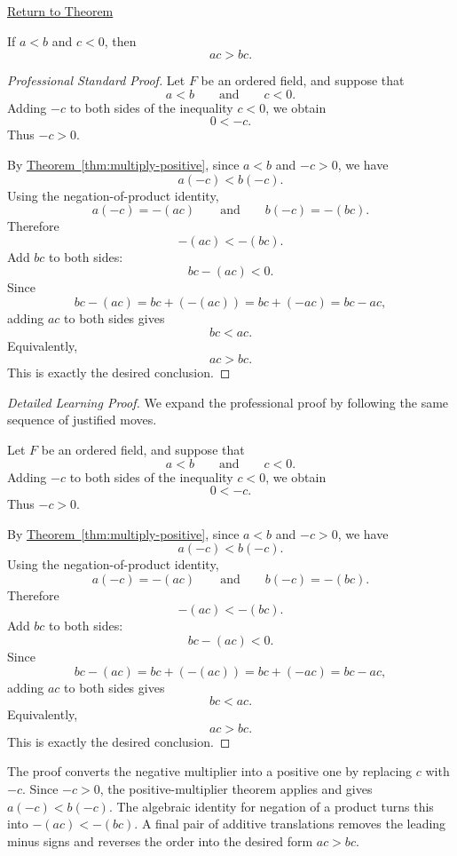 \newpage
{}
\label{prf:multiply-negative}

\begin{remark*}[Return]
\hyperref[thm:multiply-negative]{Return to Theorem}
\end{remark*}

\begin{theorem*}
If $a<b$ and $c<0$, then
\[
ac>bc.
\]
\end{theorem*}

\begin{proof}[Professional Standard Proof]
\LRAProofBodyStart
Let $F$ be an ordered field, and suppose that
\[
a<b
\qquad\text{and}\qquad
c<0.
\]
Adding $-c$ to both sides of the inequality $c<0$, we obtain
\[
0<-c.
\]
Thus $-c>0$.

By \hyperref[thm:multiply-positive]{Theorem~\ref*{thm:multiply-positive}},
since $a<b$ and $-c>0$, we have
\[
a(-c)<b(-c).
\]
Using the negation-of-product identity,
\[
a(-c)=-(ac)
\qquad\text{and}\qquad
b(-c)=-(bc).
\]
Therefore
\[
-(ac)<-(bc).
\]
Add $bc$ to both sides:
\[
bc-(ac)<0.
\]
Since
\[
bc-(ac)=bc+(-(ac))=bc+(-ac)=bc-ac,
\]
adding $ac$ to both sides gives
\[
bc<ac.
\]
Equivalently,
\[
ac>bc.
\]
This is exactly the desired conclusion.
\end{proof}

\begin{proof}[Detailed Learning Proof]
\LRAProofBodyStart
We expand the professional proof by following the same sequence of justified moves.

Let $F$ be an ordered field, and suppose that
\[
a<b
\qquad\text{and}\qquad
c<0.
\]
Adding $-c$ to both sides of the inequality $c<0$, we obtain
\[
0<-c.
\]
Thus $-c>0$.

By \hyperref[thm:multiply-positive]{Theorem~\ref*{thm:multiply-positive}},
since $a<b$ and $-c>0$, we have
\[
a(-c)<b(-c).
\]
Using the negation-of-product identity,
\[
a(-c)=-(ac)
\qquad\text{and}\qquad
b(-c)=-(bc).
\]
Therefore
\[
-(ac)<-(bc).
\]
Add $bc$ to both sides:
\[
bc-(ac)<0.
\]
Since
\[
bc-(ac)=bc+(-(ac))=bc+(-ac)=bc-ac,
\]
adding $ac$ to both sides gives
\[
bc<ac.
\]
Equivalently,
\[
ac>bc.
\]
This is exactly the desired conclusion.
\end{proof}

\begin{remark*}
The proof converts the negative multiplier into a positive one by replacing
$c$ with $-c$.  Since $-c>0$, the positive-multiplier theorem applies and
gives $a(-c)<b(-c)$.  The algebraic identity for negation of a product turns
this into $-(ac)<-(bc)$.  A final pair of additive translations removes the
leading minus signs and reverses the order into the desired form $ac>bc$.
\end{remark*}

